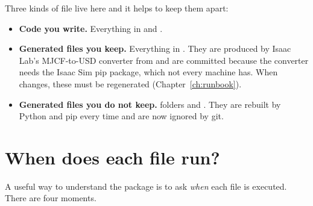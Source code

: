Three kinds of file live here and it helps to keep them apart:

\begin{itemize}[leftmargin=1.6em]
  \item \textbf{Code you write.} Everything in  and
        .
  \item \textbf{Generated files you keep.} Everything in . They
        are produced by Isaac Lab's MJCF-to-USD converter from
         and are committed because the converter needs the
        Isaac Sim pip package, which not every machine has. When
         changes, these must be regenerated
        (Chapter~\ref{ch:runbook}).
  \item \textbf{Generated files you do not keep.}  folders
        and . They are rebuilt by Python and
        pip every time and are now ignored by git.
\end{itemize}

\section{When does each file run?}
\label{sec:when}

A useful way to understand the package is to ask \emph{when} each file is
executed. There are four moments.

